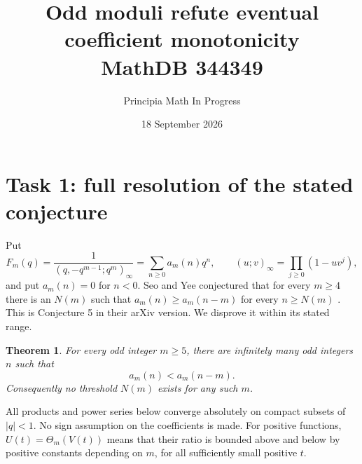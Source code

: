 \documentclass[11pt]{article}
\title{Odd moduli refute eventual coefficient monotonicity\\
\large MathDB 344349}
\author{Principia Math In Progress}
\date{18 September 2026}
\newtheorem{theorem}{Theorem}
\begin{document}
\maketitle

\section*{Task 1: full resolution of the stated conjecture}
Put
\[
 F_m(q)=\frac1{(q,-q^{m-1};q^m)_\infty}
       =\sum_{n\ge0}a_m(n)q^n,
 \qquad (u;v)_\infty=\prod_{j\ge0}(1-uv^j),
\]
and put $a_m(n)=0$ for $n<0$.
Seo and Yee conjectured that for every $m\ge4$ there is an $N(m)$
such that $a_m(n)\ge a_m(n-m)$ for every $n\ge N(m)$
\cite[Conjecture 22]{SY}. This is Conjecture 5 in their arXiv version.
We disprove it within its stated range.

\begin{theorem}\label{thm:main}
For every odd integer $m\ge5$, there are infinitely many odd integers
$n$ such that
\[
                     a_m(n)<a_m(n-m).
\]
Consequently no threshold $N(m)$ exists for any such $m$.
\end{theorem}

All products and power series below converge absolutely on compact
subsets of $|q|<1$. No sign assumption on the coefficients is made.
For positive functions, $U(t)=\Theta_m(V(t))$ means that their ratio
is bounded above and below by positive constants depending on $m$,
for all sufficiently small positive $t$.
\end{document}
